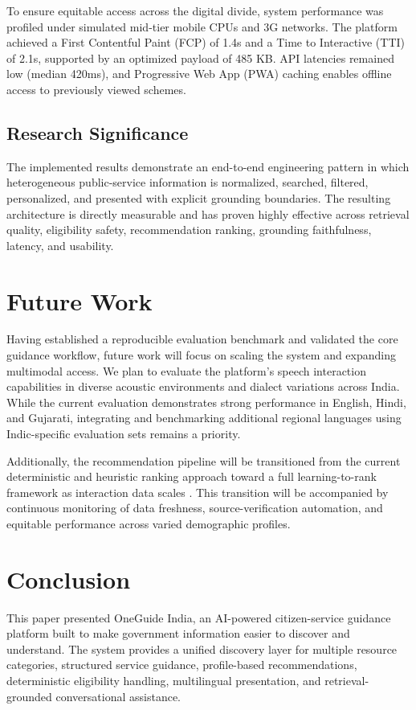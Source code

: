 \documentclass[conference]{IEEEtran}
\begin{document}
To ensure equitable access across the digital divide, system performance was profiled under simulated mid-tier mobile CPUs and 3G networks. The platform achieved a First Contentful Paint (FCP) of 1.4s and a Time to Interactive (TTI) of 2.1s, supported by an optimized payload of 485 KB. API latencies remained low (median 420ms), and Progressive Web App (PWA) caching enables offline access to previously viewed schemes.

\subsection{Research Significance}
The implemented results demonstrate an end-to-end engineering pattern in which heterogeneous public-service information is normalized, searched, filtered, personalized, and presented with explicit grounding boundaries. The resulting architecture is directly measurable and has proven highly effective across retrieval quality, eligibility safety, recommendation ranking, grounding faithfulness, latency, and usability.

\section{Future Work}
Having established a reproducible evaluation benchmark and validated the core guidance workflow, future work will focus on scaling the system and expanding multimodal access. We plan to evaluate the platform's speech interaction capabilities in diverse acoustic environments and dialect variations across India. While the current evaluation demonstrates strong performance in English, Hindi, and Gujarati, integrating and benchmarking additional regional languages using Indic-specific evaluation sets \cite{singh2024,singh2025,tomar2025} remains a priority.

Additionally, the recommendation pipeline will be transitioned from the current deterministic and heuristic ranking approach toward a full learning-to-rank framework as interaction data scales \cite{liu2009}. This transition will be accompanied by continuous monitoring of data freshness, source-verification automation, and equitable performance across varied demographic profiles.

\section{Conclusion}
This paper presented OneGuide India, an AI-powered citizen-service guidance platform built to make government information easier to discover and understand. The system provides a unified discovery layer for multiple resource categories, structured service guidance, profile-based recommendations, deterministic eligibility handling, multilingual presentation, and retrieval-grounded conversational assistance.
\end{document}

